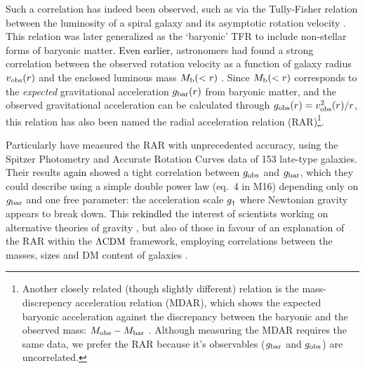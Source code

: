 \documentclass[usenatbib]{mnras}
\newcommand{\lcdm}{{\rm \Lambda CDM}}
\newcommand{\un}[1]{_{\rm #1}}
\begin{document}
Such a correlation has indeed been observed, such as via the Tully-Fisher relation \cite[TFR,][]{tully1977} between the luminosity of a spiral galaxy and its asymptotic rotation velocity \cite[]{pierce1988,bernstein1994}. This relation was later generalized as the `baryonic' TFR \cite[BTFR,][]{mcgaugh2000,mcgaugh2012} to include non-stellar forms of baryonic matter. \textcolor{black}{Even earlier}, astronomers had found a strong correlation between the observed rotation velocity as a function of galaxy radius $v\un{obs}(r)$ and the enclosed luminous mass \mbox{$M\un{b}(<r)$} \cite[]{sanders1986,sanders1996,mcgaugh2004,sanders2007,wu2015}. Since $M\un{b}(<r)$ corresponds to the \emph{expected} gravitational acceleration $g\un{bar}(r)$ from baryonic matter, and the observed gravitational acceleration can be calculated through $g\un{obs}(r)=v\un{obs}^2(r)/r$, this relation has also been named the radial acceleration relation (RAR)\footnote{Another closely related (though slightly different) relation is the mass-discrepency acceleration relation (MDAR), which shows the expected baryonic acceleration against the discrepancy between the baryonic and the observed mass: $M\un{obs}-M\un{bar}$ \cite[see][]{mcgaugh2004}. Although measuring the MDAR requires the same data, we prefer the RAR because it's observables ($g\un{bar}$ and $g\un{obs}$) are uncorrelated.}.

Particularly \citet[][hereafter M16]{mcgaugh2016} have measured the RAR with unprecedented accuracy, using the Spitzer Photometry and Accurate Rotation Curves \cite[SPARC,][]{lelli2016b} data of 153 late-type galaxies. Their results \textcolor{black}{again} showed a tight correlation between $g\un{obs}$ and $g\un{bar}$, which they could describe using a simple double power law (eq.~4 in M16) depending only on $g\un{bar}$ and one free parameter: the acceleration scale $g\un{\dagger}$ where Newtonian gravity appears to break down. This \textcolor{black}{rekindled} the interest of scientists working on alternative theories of gravity \cite[]{lelli2017a,lelli2017b,burrage2017,li2018,obrien2019}, but also of those in favour of an explanation of the RAR within the $\lcdm$ framework, employing correlations between the masses, sizes and DM content of galaxies \cite[]{keller2017,desmond2017,ludlow2017,tenneti2018}.
\end{document}
